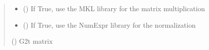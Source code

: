 \documentclass[letterpaper,10pt,english]{sphinxmanual}
\begin{document}
\begin{fulllineitems}
\begin{quote}
\begin{description}
\begin{itemize}
\item {} 
\sphinxAtStartPar
{} () \textendash{} If True, use the MKL library for the matrix multiplication

\item {} 
\sphinxAtStartPar
{} () \textendash{} If True, use the NumExpr library for the normalization

\end{itemize}

\sphinxAtStartPar
{} () \textendash{} G2t matrix

\end{description}\end{quote}

\end{fulllineitems}

\end{document}
